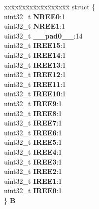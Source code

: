 \begin{DoxyCompactItemize}
\begin{tabbing}
\end{tabbing}\item 
\mbox{\label{unionSIU__tag_1_1SIU__IREER__tag_ac15e2161d1027f74576476990f20f99f}} 
\begin{tabbing}
xx\=xx\=xx\=xx\=xx\=xx\=xx\=xx\=xx\=\kill
struct \{\\
\>uint32\_t {\bfseries NREE0}:1\\
\>uint32\_t {\bfseries NREE1}:1\\
\>uint32\_t {\bfseries \_\_pad0\_\_}:14\\
\>uint32\_t {\bfseries IREE15}:1\\
\>uint32\_t {\bfseries IREE14}:1\\
\>uint32\_t {\bfseries IREE13}:1\\
\>uint32\_t {\bfseries IREE12}:1\\
\>uint32\_t {\bfseries IREE11}:1\\
\>uint32\_t {\bfseries IREE10}:1\\
\>uint32\_t {\bfseries IREE9}:1\\
\>uint32\_t {\bfseries IREE8}:1\\
\>uint32\_t {\bfseries IREE7}:1\\
\>uint32\_t {\bfseries IREE6}:1\\
\>uint32\_t {\bfseries IREE5}:1\\
\>uint32\_t {\bfseries IREE4}:1\\
\>uint32\_t {\bfseries IREE3}:1\\
\>uint32\_t {\bfseries IREE2}:1\\
\>uint32\_t {\bfseries IREE1}:1\\
\>uint32\_t {\bfseries IREE0}:1\\
\} {\bfseries B}\\


\end{tabbing}
\end{DoxyCompactItemize}
